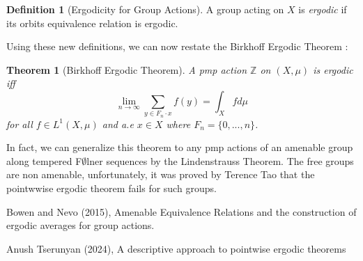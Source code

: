 \documentclass{article}
\newtheorem{theorem}{Theorem}[section]
\theoremstyle{definition}
\newtheorem{definition}{Definition}[section]
\begin{document}
\begin{definition}[Ergodicity for Group Actions]
    A group acting on $X$ is \textit{ergodic} if its orbits equivalence relation is ergodic.
\end{definition}

Using these new definitions, we can now restate the Birkhoff Ergodic Theorem :

\begin{theorem}[Birkhoff Ergodic Theorem]
    A pmp action $\mathbb{Z}$ on $(X,\mu)$ is ergodic iff 
    $$\lim_{n\to\infty}\sum_{y\in F_n\cdot x}f(y)=\int_Xfd\mu$$
    for all $f\in L^1(X,\mu)$ and a.e $x\in X$ where $F_n = \{0, ...,n\}$.
\end{theorem}

In fact, we can generalize this theorem to any pmp actions of an amenable group along tempered F$\emptyset$lner sequences by the Lindenstrauss Theorem. The free groups are non amenable, unfortunately, it was proved by Terence Tao that the pointwwise ergodic theorem fails for such groups.

\newpage




\begin{thebibliography}{9}

Bowen and Nevo (2015), Amenable Equivalence Relations and the construction of ergodic averages for group actions.

Anush Tserunyan (2024), A descriptive approach to pointwise ergodic theorems

\end{thebibliography}
\end{document}
